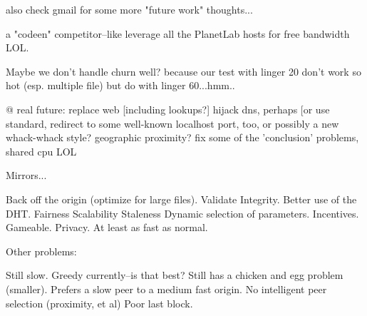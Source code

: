 also check gmail for some more "future work" thoughts...

a "codeen" competitor--like leverage all the PlanetLab hosts for free bandwidth LOL.

Maybe we don't handle churn well? because our test with linger 20 don't work so hot (esp. multiple file) but do with linger 60...hmm..

@ real future: replace web [including lookups?] hijack dns, perhaps [or use standard, redirect to some well-known localhost port, too, or possibly a new whack-whack style? geographic proximity? fix some of the 'conclusion' problems, shared cpu LOL

Mirrors...

Back off the origin (optimize for large files).
Validate Integrity.
Better use of the DHT.
Fairness
Scalability
Staleness
Dynamic selection of parameters.
Incentives.
Gameable.
Privacy.
At least as fast as normal.

Other problems:

Still slow.
Greedy currently--is that best?
Still has a chicken and egg problem (smaller).
Prefers a slow peer to a medium fast origin.
No intelligent peer selection (proximity, et al)
Poor last block.